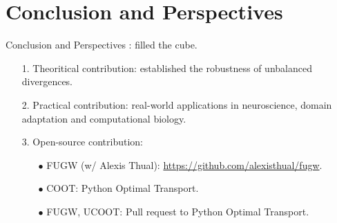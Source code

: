 \documentclass{beamer}
\begin{document}
\section{Conclusion and Perspectives}
\begin{frame}{Conclusion and Perspectives}
\scriptsize
\vspace{0.5cm}
{}: filled the cube.
\vspace{0.1cm}
\begin{enumerate}
  \setlength\itemsep{0.1cm}
  \item[1.] Theoritical contribution: established the robustness of unbalanced divergences.
  \item[2.] Practical contribution: real-world applications in neuroscience, domain adaptation and computational biology.
  \vspace{-0.1cm}
  \item[3.] Open-source contribution:
  \vspace{0.1cm}
  \begin{itemize}
    \setlength\itemindent{5pt}
    \scriptsize
    \setlength\itemsep{0.1cm}
    \item[$\bullet$] FUGW (w/ Alexis Thual): \url{https://github.com/alexisthual/fugw}.
    \item[$\bullet$] COOT: Python Optimal Transport.
    \item[$\bullet$] FUGW, UCOOT: Pull request to Python Optimal Transport.
  \end{itemize}
\end{enumerate}
\end{frame}
\end{document}
